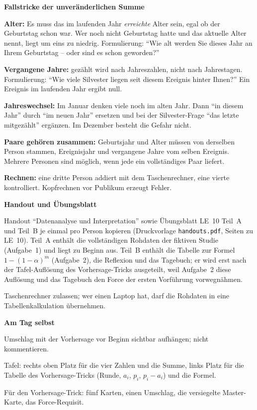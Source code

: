 \begin{vorbereitung}
\textbf{Fallstricke der unveränderlichen Summe}
\begin{checkliste}
  \item \textbf{Alter:} Es muss das im laufenden Jahr \emph{erreichte}
    Alter sein, egal ob der Geburtstag schon war. Wer noch nicht
    Geburtstag hatte und das aktuelle Alter nennt, liegt um eins zu
    niedrig. Formulierung: \enquote{Wie alt werden Sie dieses Jahr an
    Ihrem Geburtstag -- oder sind es schon geworden?}
  \item \textbf{Vergangene Jahre:} gezählt wird nach Jahreszahlen, nicht
    nach Jahrestagen. Formulierung: \enquote{Wie viele Silvester liegen
    seit diesem Ereignis hinter Ihnen?} Ein Ereignis im laufenden Jahr
    ergibt null.
  \item \textbf{Jahreswechsel:} Im Januar denken viele noch im alten Jahr.
    Dann \enquote{in diesem Jahr} durch \enquote{im neuen Jahr} ersetzen
    und bei der Silvester-Frage \enquote{das letzte mitgezählt} ergänzen.
    Im Dezember besteht die Gefahr nicht.
  \item \textbf{Paare gehören zusammen:} Geburtsjahr und Alter müssen von
    derselben Person stammen, Ereignisjahr und vergangene Jahre vom
    selben Ereignis. Mehrere Personen sind möglich, wenn jede ein
    vollständiges Paar liefert.
  \item \textbf{Rechnen:} eine dritte Person addiert mit dem
    Taschenrechner, eine vierte kontrolliert. Kopfrechnen vor Publikum
    erzeugt Fehler.
\end{checkliste}

\textbf{Handout und Übungsblatt}
\begin{checkliste}
  \item Handout \enquote{Datenanalyse und Interpretation} sowie
    Übungsblatt LE~10 Teil~A und Teil~B je einmal pro Person kopieren
    (Druckvorlage \texttt{handouts.pdf}, Seiten zu LE~10). Teil~A enthält
    die vollständigen Rohdaten der fiktiven Studie (Aufgabe~1) und liegt
    zu Beginn aus. Teil~B enthält die Tabelle zur Formel
    $1-(1-\alpha)^m$ (Aufgabe~2), die Reflexion und das Tagebuch; er wird
    erst nach der Tafel-Auflösung des Vorhersage-Tricks ausgeteilt, weil
    Aufgabe~2 diese Auflösung und das Tagebuch den Force der ersten
    Vorführung vorwegnähmen.
  \item Taschenrechner zulassen; wer einen Laptop hat, darf die Rohdaten
    in eine Tabellenkalkulation übernehmen.
\end{checkliste}

\textbf{Am Tag selbst}
\begin{checkliste}
  \item Umschlag mit der Vorhersage vor Beginn sichtbar aufhängen; nicht
    kommentieren.
  \item Tafel: rechts oben Platz für die vier Zahlen und die Summe, links
    Platz für die Tabelle des Vorhersage-Tricks (Runde, $a_i$, $p_i$,
    $p_i-a_i$) und die Formel.
  \item Für den Vorhersage-Trick: fünf Karten, einen Umschlag, die
    versiegelte Master-Karte, das Force-Requisit.
\end{checkliste}


\end{vorbereitung}
